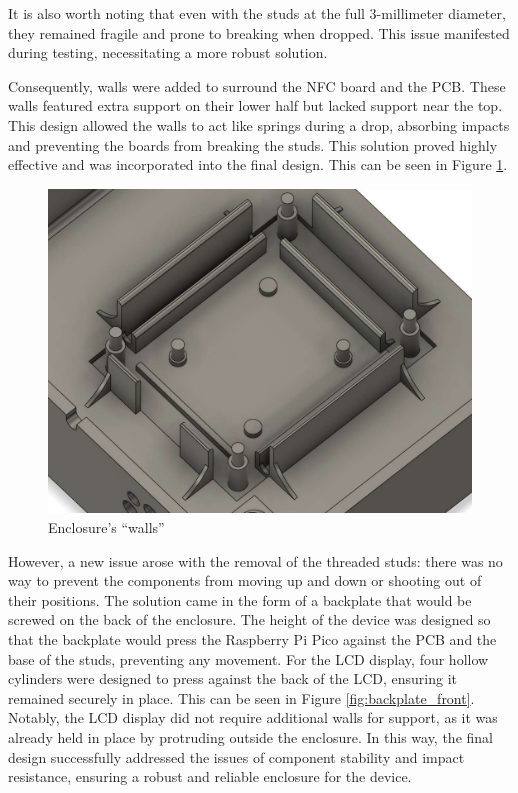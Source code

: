 It is also worth noting that even with the studs at the full 3-millimeter diameter, they remained 
fragile and prone to breaking when dropped. This issue manifested during testing, necessitating a 
more robust solution.

Consequently, walls were added to surround the NFC board and the PCB. These walls featured extra 
support on their lower half but lacked support near the top. This design allowed the walls to 
act like springs during a drop, absorbing impacts and preventing the boards from breaking the 
studs. This solution proved highly effective and was incorporated into the final design. This 
can be seen in Figure \ref{fig:enclosure_walls}.

\begin{figure}[h]
	\centering
	\includegraphics[width = .5\textwidth]{Imagenes/Vectorial/enclosure_walls.pdf}
	\caption{Enclosure's ``walls''}
	\label{fig:enclosure_walls}
\end{figure}

However, a new issue arose with the removal of the threaded studs: there was no way to prevent the 
components from moving up and down or shooting out of their positions. The solution came in the 
form of a backplate that would be screwed on the back of the enclosure. The height of the 
device was designed so that the backplate would press the Raspberry Pi Pico against the PCB and 
the base of the studs, preventing any movement. For the LCD display, four hollow cylinders were 
designed to press against the back of the LCD, ensuring it remained securely in place. This can be 
seen in Figure \ref{fig:backplate_front}. Notably, the LCD display did not require additional 
walls for support, as it was already held in place by protruding outside the enclosure. In this 
way, the final design successfully addressed the issues of component stability and impact 
resistance, ensuring a robust and reliable enclosure for the device.

